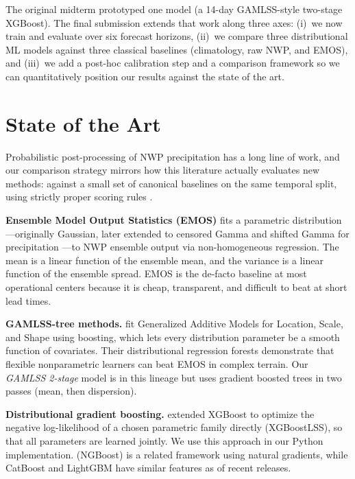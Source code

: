 \documentclass[11pt]{article}
\begin{document}
The original midterm prototyped one model (a 14-day GAMLSS-style two-stage XGBoost). The final submission extends that work along three axes: (i)~we now train and evaluate over six forecast horizons, (ii)~we compare three distributional ML models against three classical baselines (climatology, raw NWP, and EMOS), and (iii)~we add a post-hoc calibration step and a comparison framework so we can quantitatively position our results against the state of the art.

\section{State of the Art}

Probabilistic post-processing of NWP precipitation has a long line of work, and our comparison strategy mirrors how this literature actually evaluates new methods: against a small set of canonical baselines on the same temporal split, using strictly proper scoring rules \citep{gneiting2007strictly}.

\textbf{Ensemble Model Output Statistics (EMOS)} \citep{gneiting2005} fits a parametric distribution---originally Gaussian, later extended to censored Gamma and shifted Gamma for precipitation \citep{scheuerer2014}---to NWP ensemble output via non-homogeneous regression. The mean is a linear function of the ensemble mean, and the variance is a linear function of the ensemble spread. EMOS is the de-facto baseline at most operational centers because it is cheap, transparent, and difficult to beat at short lead times.

\textbf{GAMLSS-tree methods.} \citet{schlosser2019} fit Generalized Additive Models for Location, Scale, and Shape using boosting, which lets every distribution parameter be a smooth function of covariates. Their distributional regression forests demonstrate that flexible nonparametric learners can beat EMOS in complex terrain. Our \textit{GAMLSS 2-stage} model is in this lineage but uses gradient boosted trees in two passes (mean, then dispersion).

\textbf{Distributional gradient boosting.} \citet{marz2022} extended XGBoost to optimize the negative log-likelihood of a chosen parametric family directly (XGBoostLSS), so that all parameters are learned jointly. We use this approach in our Python implementation. \citet{duan2020ngboost} (NGBoost) is a related framework using natural gradients, while CatBoost and LightGBM have similar features as of recent releases.
\end{document}
